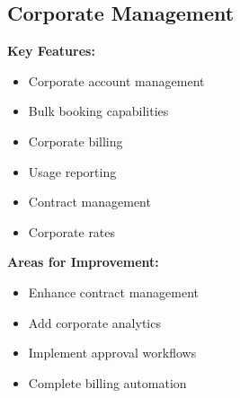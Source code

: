 \subsection{Corporate Management}
\begin{tcolorbox}[
    enhanced,
    title={Corporate Management: 70\% Complete},
    attach boxed title to top left,
    boxed title style={
        colback=warning!50,
        colframe=warning!50,
        arc=0mm,
    },
    colback=white,
    colframe=warning!50,
    arc=0mm,
    fonttitle=\bfseries
]
    \textbf{Key Features:}
    \begin{itemize}
        \item Corporate account management
        \item Bulk booking capabilities
        \item Corporate billing
        \item Usage reporting
        \item Contract management
        \item Corporate rates
    \end{itemize}
    
    \textbf{Areas for Improvement:}
    \begin{itemize}
        \item Enhance contract management
        \item Add corporate analytics
        \item Implement approval workflows
        \item Complete billing automation
    \end{itemize}
\end{tcolorbox}

